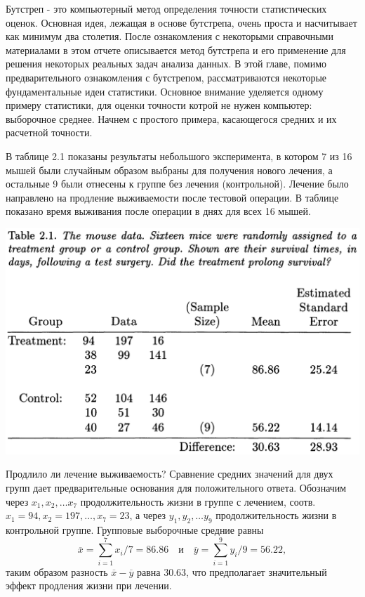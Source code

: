 Бутстреп - это компьютерный метод определения точности статистических оценок. Основная идея, лежащая в основе бутстрепа, очень проста и насчитывает как минимум два столетия. После ознакомления с некоторыми справочными материалами в этом отчете описывается метод бутстрепа и его применение для решения некоторых реальных задач анализа данных. В этой главе, помимо предварительного ознакомления с бутстрепом, рассматриваются некоторые фундаментальные идеи статистики. Основное внимание уделяется одному примеру статистики, для оценки точности котрой не нужен компьютер: выборочное среднее. Начнем с простого примера, касающегося средних и их расчетной точности. 

В таблице 2.1 показаны результаты небольшого эксперимента, в котором 7 из 16 мышей были случайным образом выбраны для получения нового лечения, а остальные 9 были отнесены к группе без лечения (контрольной). Лечение было направлено на продление выживаемости после тестовой операции. В таблице показано время выживания после операции в днях для всех 16 мышей. \newline

\noindent
\includegraphics[width=\linewidth]{1/t1.png}
\newline

Продлило ли лечение выживаемость? Сравнение средних значений для двух групп дает предварительные основания для положительного ответа. Обозначим через $x_1,x_2,\ldots x_7$ продолжительность жизни в группе с лечением, соотв. $x_1=94,x_2=197,\ldots,x_7=23$, а через $y_1,y_2,\ldots y_9$ продолжительность жизни в контрольной группе. Групповые выборочные средние равны
\begin{equation}
    \overline x = \sum_{i=1}^7 x_i/7 = 86.86 \quad \texttt{и} \quad \overline y = \sum_{i=1}^9 y_i/9 = 56.22,
\end{equation}
таким образом разность $\overline x - \overline y$ равна $30.63$, что предполагает значительный эффект продления жизни при лечении.

